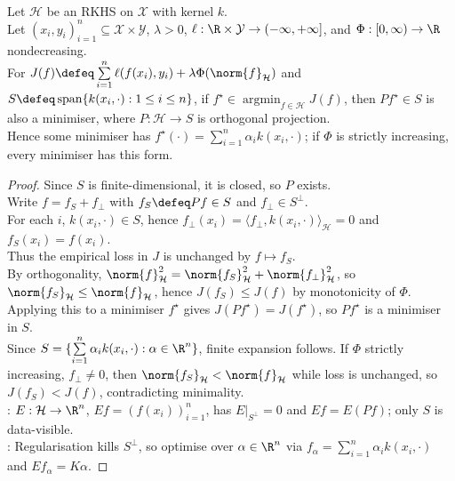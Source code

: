 \begin{theorem} \label{thm:sl-representer-theorem-form} \\
Let $\mathcal{H}$ be an RKHS on $\mathcal{X}$ with kernel $k$.\\
Let $(x_i,y_i)_{i=1}^n\subseteq\mathcal{X}\times\mathcal{Y}$, $\lambda>0$, $\ell:\R\times\mathcal{Y}\to(-\infty,+\infty]$, and $\Phi:[0,\infty)\to\R$ nondecreasing.\\
For $J(f)\defeq\sum\limits_{i=1}^n\ell(f(x_i),y_i)+\lambda\Phi(\norm{f}_{\mathcal{H}})$ and $S\defeq\operatorname{span}\{k(x_i,\cdot):1\leq i\leq n\}$, if $f^\star\in\operatorname*{argmin}_{f\in\mathcal{H}}J(f)$, then $Pf^\star\in S$ is also a minimiser, where $P:\mathcal{H}\to S$ is orthogonal projection.\\
Hence some minimiser has $f^\star(\cdot)=\sum\limits_{i=1}^n\alpha_i k(x_i,\cdot)$; if $\Phi$ is strictly increasing, every minimiser has this form.
\begin{proof} Since $S$ is finite-dimensional, it is closed, so $P$ exists.\\
Write $f=f_S+f_\perp$ with $f_S\defeq Pf\in S$ and $f_\perp\in S^\perp$. \\
For each $i$, $k(x_i,\cdot)\in S$, hence $f_\perp(x_i)=\langle f_\perp,k(x_i,\cdot)\rangle_{\mathcal{H}}=0$ and $f_S(x_i)=f(x_i)$.\\
Thus the empirical loss in $J$ is unchanged by $f\mapsto f_S$.\\
By orthogonality, $\norm{f}_{\mathcal{H}}^2=\norm{f_S}_{\mathcal{H}}^2+\norm{f_\perp}_{\mathcal{H}}^2$, so $\norm{f_S}_{\mathcal{H}}\leq\norm{f}_{\mathcal{H}}$, hence $J(f_S)\leq J(f)$ by monotonicity of $\Phi$. \\
Applying this to a minimiser $f^\star$ gives $J(Pf^\star)=J(f^\star)$, so $Pf^\star$ is a minimiser in $S$.\\
Since $S=\{\sum\limits_{i=1}^n\alpha_i k(x_i,\cdot):\alpha\in\R^n\}$, finite expansion follows. If $\Phi$ strictly increasing, $f_\perp\neq0$, then $\norm{f_S}_{\mathcal{H}}<\norm{f}_{\mathcal{H}}$ while loss is unchanged, so $J(f_S)<J(f)$, contradicting minimality.\\
: $E:\mathcal{H}\to\R^n$, $Ef=(f(x_i))_{i=1}^n$, has $E|_{S^\perp}=0$ and $Ef=E(Pf)$; only $S$ is data-visible.\\
: Regularisation kills $S^\perp$, so optimise over $\alpha\in\R^n$ via $f_\alpha=\sum_{i=1}^n\alpha_i k(x_i,\cdot)$ and $Ef_\alpha=K\alpha$.
\end{proof}
\end{theorem}

